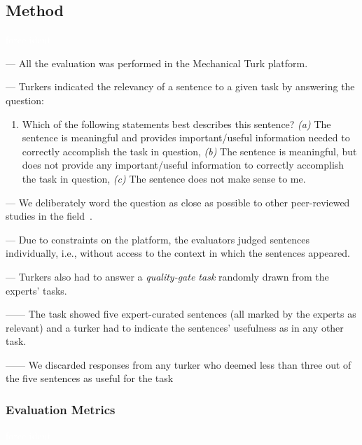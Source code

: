    

\subsection{Method}
\textcolor{white}{force ident} %


--- All the evaluation was performed in the Mechanical Turk platform. \vspace{3mm}

--- Turkers indicated the relevancy of a sentence to a given task  by answering the question: \vspace{3mm}

\begin{enumerate}[leftmargin=\parindent, font=\normalfont\itshape, label=SR\textsubscript{\arabic*}]
    \item Which of the following statements best describes this sentence? 
    \textit{(a)} The sentence is meaningful and provides important/useful information needed to correctly accomplish the task in question, 
    \textit{(b)} The sentence is meaningful, but does not provide any important/useful information to correctly accomplish the task in question, 
    \textit{(c)} The sentence does not make sense to me.
\end{enumerate}

--- We deliberately word the question as close as possible to other peer-reviewed studies in the field~\cite{nadi2020, Xu2017}. \vspace{3mm}


--- Due to constraints on the platform, the evaluators judged sentences individually, i.e., without access to the context in which the sentences appeared. \vspace{3mm}

--- Turkers also had to answer a \textit{quality-gate task} randomly drawn from the experts' tasks.

------ The task showed five expert-curated sentences (all marked by the experts as relevant) and a turker had to indicate the sentences' usefulness as in any other task.

------ We discarded responses from any turker who deemed less than three out of the five sentences as useful for the task


\subsubsection{Evaluation Metrics}
\textcolor{white}{force ident} %

